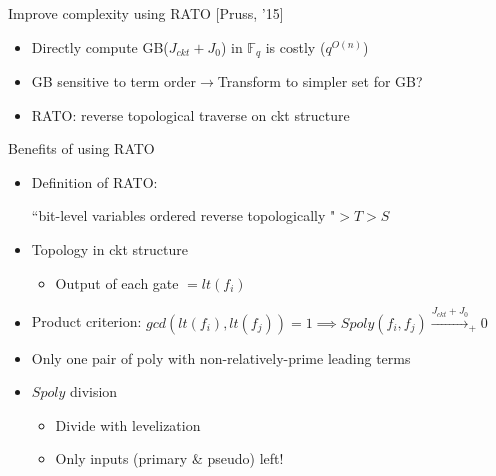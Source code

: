 \documentclass[xcolor=dvipsnames]{beamer}
\newcommand{\Fq}{{\mathbb{F}}_{q}}
\newcommand{\bi}{\begin{itemize}}
\newcommand{\ei}{\end{itemize}}
\begin{document}
\begin{frame}{\large{Improve complexity using RATO [Pruss, '15]}}
\bi
\item Directly compute GB($J_{ckt}+J_0$) in $\Fq$ is costly ($q^{O(n)}$)
\item GB sensitive to term order$\to$Transform to simpler set for GB?
\pause
\item RATO: reverse topological traverse on ckt structure
\ei
\begin{figure}[H]
\end{figure}

\end{frame}
\begin{frame}[label = linkRATO]{\large{Benefits of using RATO}}
\bi
\item Definition of RATO:\par 
``bit-level variables ordered reverse topologically "$ > T>S$
\item Topology in ckt structure
	\bi
	\item Output of each gate $= lt(f_i)$
	\ei
\item Product criterion: $gcd(lt(f_i),lt(f_j)) = 1 \implies Spoly(f_i,f_j) \xrightarrow{J_{ckt}+J_0}_+ 0$
\hyperlink{Buch}{}
\item Only one pair of poly with non-relatively-prime leading terms
	
\item $Spoly$ division
	\bi
	\item Divide with levelization
	\item Only inputs (primary \& pseudo) left!
	\ei
\ei
\end{frame}
\end{document}

